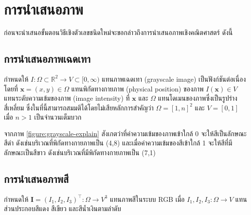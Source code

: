 \section{การนำเสนอภาพ}

\hspace{1cm} ก่อนจะนำเสนอขั้นตอนวิธีเชิงตัวเลขชนิดใหม่จะขอกล่าวถึงการนำเสนอภาพเชิงคณิตศาสตร์ ดังนี้

\subsection{การนำเสนอภาพเฉดเทา}

\hspace{1cm} กำหนดให้ $I : \Omega \subset \mathbb{R}^2 \rightarrow V \subset [0,\infty)$ แทนภาพเฉดเทา (grayscale image)  เป็นฟังก์ชันต่อเนื่อง โดยที่ $ \mathbf{x} = (x,y) \in \Omega $ แทนพิกัดทางกายภาพ (physical position) ของภาพ $ I(\mathbf{x}) \in V $ แทนระดับความเข้มของภาพ (image intensity) ที่ $ \mathbf{x} $ และ $ \Omega $ แทนโดเมนของภาพซึ่งเป็นรูปร่างสี่เหลี่ยม ซึ่งในที่นี้สามารถสมมติได้โดยไม่เสียหลักการสำคัญว่า $ \Omega = [1,n]^2 $ และ $ V = [0,1] $ เมื่อ $n>1$ เป็นจำนวนเต็มบวก 



\hspace{1cm} จากภาพ \ref{figure:grayscale-explain} สังเกตว่าที่ค่าความเข้มของภาพเข้าใกล้ 0 จะให้สีเป็นลักษณะสีดำ ดังเช่นบริเวณที่พิกัดทางกายภาพเป็น (4,8) และเมื่อค่าความเข้มของสีเข้าใกล้ 1 จะให้สีที่มีลักษณะเป็นสีขาว ดังเช่นบริเวณที่มีพิกัดทางกายภาพเป็น (7,1)

\subsection{การนำเสนอภาพสี}

\hspace{1cm} กำหนดให้ $ \boldsymbol{I} = (I_1,I_2,I_3)^{\top} : \Omega  \rightarrow V^3 $ แทนภาพสีในระบบ RGB เมื่อ $I_1,I_2,I_3: \Omega  \rightarrow V$ แทนส่วนประกอบสีแดง สีเขียว และสีน้ำเงินตามลำดับ

